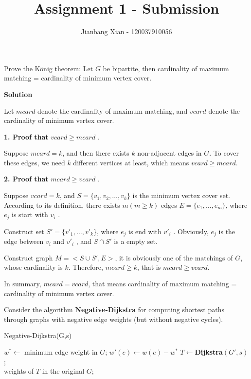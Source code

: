 \documentclass{article}
\title{{\bf Assignment 1 - Submission}}
\author{Jianbang Xian - 120037910056}
\date{}
\newcounter{exercise}
\newcommand{\<}{
    \langle}
\renewcommand{\>}{
    \rangle}
\begin{document}
\maketitle


{\large





\begin{exercise}
Prove the K\"onig theorem: Let $G$ be bipartite, then cardinality of maximum matching = cardinality of minimum vertex cover.
\end{exercise}

\bigskip
\noindent \textbf{Solution}

Let $mcard$ denote the cardinality of maximum matching, and $vcard$ denote the cardinality of minimum vertex cover.

\bigskip
\textbf{1. Proof that } $vcard \ge mcard$ .

Suppose $mcard = k$, and then there exists $k$ non-adjacent edges in $G$. To cover these edges, we need $k$ different vertices at least, which means $vcard \ge mcard$.

\bigskip
\textbf{2. Proof that } $mcard \ge vcard$ .

Suppose $vcard = k$, and $S = \{v_1, v_2, \dots, v_k\}$ is the minimum vertex cover set. According to its definition, there exists $m (m \ge k)$ edges $E = \{e_1, \dots, e_m\}$, where $e_j$ is start with $v_i$ . 

Construct set $S' = \{ v'_{1}, \dots, v'_{k}\}$, where $e_j$ is end with $v'_{i}$ . Obviously, $e_j$ is the edge between $v_i$ and $v'_{i}$ , and $S \cap S'$ is a empty set. 

Construct graph $M = <S \cup S', E>$, it is obviously one of the matchings of $G$, whose cardinality is $k$. Therefore, $mcard \ge k$, that is $mcard \ge vcard$.

\bigskip
In summary, $mcard = vcard$, that means cardinality of maximum matching = cardinality of minimum vertex cover.



\begin{exercise}
Consider the algorithm \textbf{Negative-Dijkstra} for computing shortest paths through graphs with negative edge weights (but without negative cycles). 
\begin{algorithm}[htb]
\caption{Negative-Dijkstra(G,s)}
\begin{algorithmic}[1]
\State $w^*\leftarrow$ minimum edge weight in $G$;
\State $w'(e)\leftarrow w(e)-w^*$
\EndFor
\State $T\leftarrow$\textbf{Dijkstra}$(G',s)$; \\
\Return weights of $T$ in the original $G$;
\end{algorithmic}
\end{algorithm}


\end{exercise}}
\end{document}
